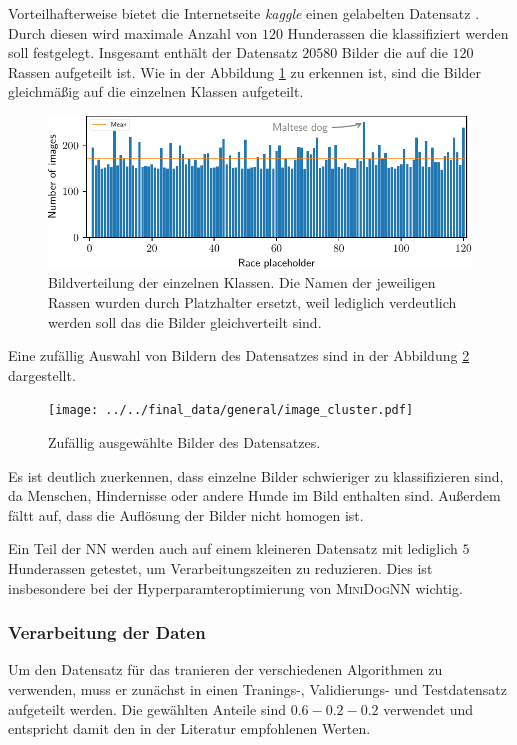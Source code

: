 Vorteilhafterweise bietet die Internetseite \emph{kaggle} einen gelabelten
Datensatz \cite{datensatz}. Durch diesen wird maximale Anzahl von $120$
Hunderassen die klassifiziert werden soll festgelegt. Insgesamt enthält der
Datensatz $20580$ Bilder die auf die $120$ Rassen aufgeteilt ist. Wie in der
Abbildung \ref{fig:gleichverteilung_bilder} zu erkennen ist, sind die Bilder
gleichmäßig auf die einzelnen Klassen aufgeteilt.
\begin{figure}
\centering
\includegraphics[width=\the\textwidth]{../../final_data/general/image_distribution.pdf}
\caption{Bildverteilung der einzelnen Klassen. Die Namen der jeweiligen Rassen
         wurden durch Platzhalter ersetzt, weil lediglich verdeutlich werden soll
         das die Bilder gleichverteilt sind.}
\label{fig:gleichverteilung_bilder}
\end{figure}
Eine zufällig Auswahl von Bildern des Datensatzes sind in der Abbildung \ref{fig:bilder_cluser}
dargestellt.
\begin{figure}
\centering
\texttt{[image: ../../final\_data/general/image\_cluster.pdf]}
\caption{Zufällig ausgewählte Bilder des Datensatzes.}
\label{fig:bilder_cluser}
\end{figure}
Es ist deutlich zuerkennen, dass einzelne Bilder schwieriger zu klassifizieren sind,
da Menschen, Hindernisse oder andere Hunde im Bild enthalten sind. Außerdem
fältt auf, dass die Auflösung der Bilder nicht homogen ist.

Ein Teil der NN werden auch auf einem kleineren Datensatz mit lediglich $5$ Hunderassen
getestet, um Verarbeitungszeiten zu reduzieren. Dies ist insbesondere bei
der Hyperparamteroptimierung von \textsc{MiniDogNN} wichtig.

\subsubsection{Verarbeitung der Daten}
Um den Datensatz für das tranieren der verschiedenen Algorithmen zu verwenden,
muss er zunächst in einen Tranings-, Validierungs- und Testdatensatz aufgeteilt
werden. Die gewählten Anteile sind $0.6-0.2-0.2$ verwendet und entspricht damit
den in der Literatur \cite[S. 29]{hands_on_machine_learning} empfohlenen Werten.

